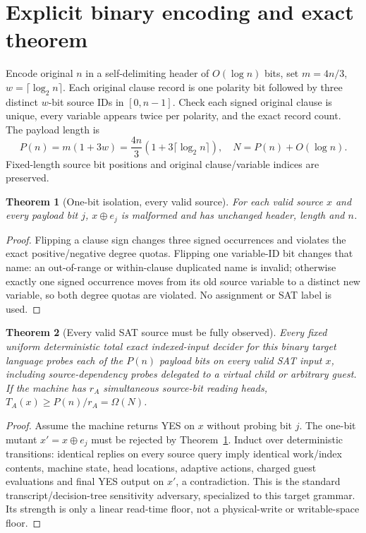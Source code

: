 \documentclass[11pt]{article}
\newtheorem{theorem}{Theorem}
\begin{document}
\section{Explicit binary encoding and exact theorem}
Encode original \(n\) in a self-delimiting header of \(O(\log n)\) bits, set \(m=4n/3\), \(w=\lceil\log_2 n\rceil\). Each original clause record is one polarity bit followed by three distinct \(w\)-bit source IDs in \([0,n-1]\). Check each signed original clause is unique, every variable appears twice per polarity, and the exact record count. The payload length is
\[
P(n)=m(1+3w)=\frac{4n}{3}(1+3\lceil\log_2 n\rceil),\quad N=P(n)+O(\log n).
\]
Fixed-length source bit positions and original clause/variable indices are preserved.
\begin{theorem}[One-bit isolation, every valid source]\label{iso}
For each valid source \(x\) and every payload bit \(j\), \(x\oplus e_j\) is malformed and has unchanged header, length and \(n\).
\end{theorem}
\begin{proof}
Flipping a clause sign changes three signed occurrences and violates the exact positive/negative degree quotas. Flipping one variable-ID bit changes that name: an out-of-range or within-clause duplicated name is invalid; otherwise exactly one signed occurrence moves from its old source variable to a distinct new variable, so both degree quotas are violated. No assignment or SAT label is used.
\end{proof}
\begin{theorem}[Every valid SAT source must be fully observed]\label{satfloor}
Every fixed uniform deterministic \emph{total exact} indexed-input decider for this binary target language probes \emph{each of the \(P(n)\) payload bits} on every valid SAT input \(x\), including source-dependency probes delegated to a virtual child or arbitrary guest. If the machine has \(r_A\) simultaneous source-bit reading heads, \(T_A(x)\ge P(n)/r_A=\Omega(N)\).
\end{theorem}
\begin{proof}
Assume the machine returns YES on \(x\) without probing bit \(j\). The one-bit mutant \(x'=x\oplus e_j\) must be rejected by Theorem~\ref{iso}. Induct over deterministic transitions: identical replies on every source query imply identical work/index contents, machine state, head locations, adaptive actions, charged guest evaluations and final YES output on \(x'\), a contradiction. This is the standard transcript/decision-tree sensitivity adversary, specialized to this target grammar. Its strength is only a linear read-time floor, not a physical-write or writable-space floor.
\end{proof}
\end{document}
